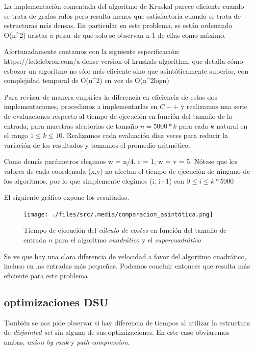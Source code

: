 \vspace{1em}
La implementación comentada del algoritmo de Kruskal parece eficiente cuando se trata de grafos ralos pero resulta menos que satisfactoria cuando se trata de estructuras más densas. En particular en este problema, se están ordenando O(n^2) aristas a pesar de que solo se observan n-1 de ellas como máximo.

Afortunadamente contamos con la siguiente especificación: https://fedelebron.com/a-dense-version-of-kruskals-algorithm, que detalla cómo esbozar un algoritmo no sólo más eficiente sino que asintóticamente superior, con complejidad temporal de O(n^2) en vez de O(n^2logn)

Para revisar de manera empírica la diferencia en eficiencia de estas dos implementaciones, procedimos a implementarlas en $C++$ y realizamos una serie de evaluaciones respecto al tiempo de ejecución en función del tamaño de la entrada, para muestras aleatorias de tamaño $n = 5000*k$ para cada $k$ natural en el rango $1 \leq k \leq 10$. Realizamos cada evaluación diez veces para reducir la variación de los resultados y tomamos el promedio aritmético.

Como demás parámetros elegimos w = n/4, r = 1, w = v = 5. Nótese que los valores de cada coordenada (x,y) no afectan el tiempo de ejecución de ninguno de los algoritmos, por lo que simplemente elegimos (i, i+1) con $0 \leq i \leq k*5000$

El siguiente gráfico expone los resultados.

\begin{figure}[!htbp]
    \texttt{[image: ./files/src/.media/comparacion\_asintótica.png]}
    \caption{Tiempo de ejecución del \textit{cálculo de costos} en función del tamaño de entrada $n$ para el algoritmo \textit{cuadrático} y el \textit{supercuadrático}}
\end{figure}

Se ve que hay una clara diferencia de velocidad a favor del algoritmo cuadrático, incluso en las entradas más pequeñas. Podemos concluir entonces que resulta más eficiente para este problema

\subsection{optimizaciones DSU}

También se nos pide observar si hay diferencia de tiempos al utilizar la estructura de \textit{disjointed set} sin alguna de sus optimizaciones. En este caso obviaremos ambas, \textit{union by rank} y \textit{path compression}. 


